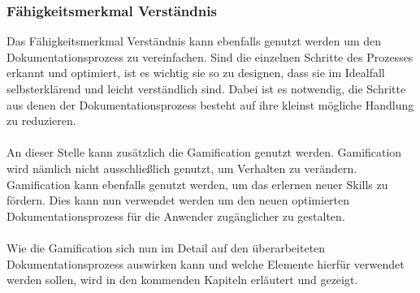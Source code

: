 \documentclass[a4paper,12pt,twoside]{scrartcl}
\begin{document}
\subsubsection{Fähigkeitsmerkmal Verständnis}
Das Fähigkeitsmerkmal Verständnis kann ebenfalls genutzt werden um den Dokumentationsprozess zu vereinfachen. Sind die einzelnen Schritte des Prozesses erkannt und optimiert, ist es wichtig sie so zu designen, dass sie im Idealfall selbsterklärend und leicht verständlich sind. Dabei ist es notwendig, die Schritte aus denen der Dokumentationsprozess besteht auf ihre kleinst mögliche Handlung zu reduzieren.
\\\\
An dieser Stelle kann zusätzlich die Gamification genutzt werden. Gamification wird nämlich nicht ausschließlich genutzt, um Verhalten zu verändern. Gamification kann ebenfalls genutzt werden, um das erlernen neuer Skills zu fördern. Dies kann nun verwendet werden um den neuen optimierten Dokumentationsprozess für die Anwender zugänglicher zu gestalten.
\\\\
Wie die Gamification sich nun im Detail auf den überarbeiteten Dokumentationsprozess auswirken kann und welche Elemente hierfür verwendet werden sollen, wird in den kommenden Kapiteln erläutert und gezeigt.
\end{document}
